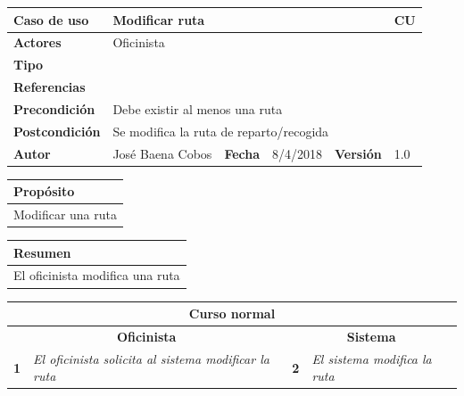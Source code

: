 \documentclass[12pt,spanish]{article}
\begin{document}
\begin{table}[H]
	\centering
	\begin{tabular}{|m{3cm}|m{4cm}|m{2cm}|m{2cm}|m{2cm}|m{1cm}|}
		\hline
		\textbf{Caso de uso} &  \multicolumn{4}{m{11cm}|}{Modificar ruta} \vline &  \cellcolor{gray!40}CU\arabic{contadorCU}  \stepcounter{contadorCU} \\
		\hline
		\textbf{Actores} & \multicolumn{5}{m{11cm}|}{Oficinista} \\
		\hline
		\textbf{Tipo} & \multicolumn{5}{m{11cm}|}{} \\
		\hline
		\textbf{Referencias} &\multicolumn{5}{m{11cm}|}{} \\
		\hline
		\textbf{Precondición} & \multicolumn{5}{m{11cm}|}{Debe existir al menos una ruta} \\
		\hline
		\textbf{Postcondición} & \multicolumn{5}{m{11cm}|}{Se modifica la ruta de reparto/recogida} \\
		\hline
		\textbf{Autor} & José Baena Cobos & \textbf{Fecha} & 8/4/2018 & \textbf{Versión} & 1.0 \\
		\hline
	\end{tabular}
	
	\vspace{1cm}
	
	\begin{tabular}{|m{16.2cm}|}
		\hline
		\textbf{Propósito} \\
		\hline
		Modificar una ruta\\
		\hline
	\end{tabular}
	
	\vspace{1cm}
	
	\begin{tabular}{|m{16.2cm}|}
		\hline
		\textbf{Resumen} \\
		\hline
		El oficinista modifica una ruta\\
		\hline
	\end{tabular}
	
	\vspace{1cm}
	
	\begin{tabular}{|m{5pt}|m{7.33cm}|m{5pt}|m{7.33cm}|}
		\hline
		\multicolumn{4}{|c|}{\textbf{Curso normal}} \\
		\hline
		\multicolumn{2}{|c}{\textbf{Oficinista}} & \multicolumn{2}{|c|}{\textbf{Sistema}} \\
		\hline
		\textbf{1} & \textit{El oficinista solicita al sistema modificar la ruta} & \textbf{2} & \textit{El sistema modifica la ruta} \\
		\hline
	

\end{tabular}
\end{table}
\end{document}
